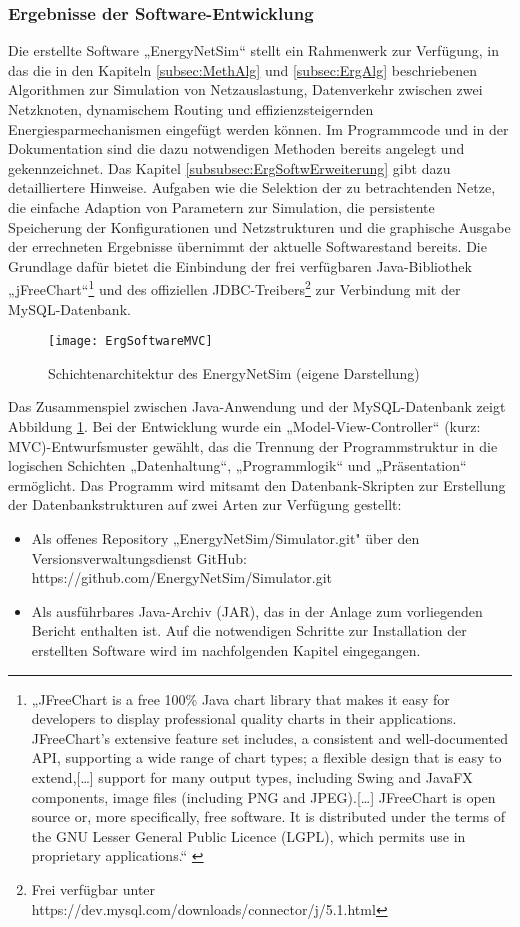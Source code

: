 \subsubsection{Ergebnisse der Software-Entwicklung}
Die erstellte Software „EnergyNetSim“ stellt ein Rahmenwerk zur Verfügung, in das die in den Kapiteln
\ref{subsec:MethAlg} und \ref{subsec:ErgAlg} beschriebenen Algorithmen zur Simulation von Netzauslastung, Datenverkehr zwischen zwei Netzknoten, dynamischem Routing und effizienzsteigernden Energiesparmechanismen eingefügt werden können. Im Programmcode und in der Dokumentation sind die dazu notwendigen Methoden bereits angelegt und gekennzeichnet. Das Kapitel \ref{subsubsec:ErgSoftwErweiterung} gibt dazu detailliertere Hinweise.
Aufgaben wie die Selektion der zu betrachtenden Netze, die einfache Adaption von Parametern zur Simulation, die persistente Speicherung der Konfigurationen und Netzstrukturen und die graphische Ausgabe der errechneten Ergebnisse übernimmt der aktuelle Softwarestand bereits. Die Grundlage dafür bietet die Einbindung der frei verfügbaren Java-Bibliothek „jFreeChart“\footnote{„JFreeChart is a free 100\% Java chart library that makes it easy for developers to display professional quality charts in their applications. JFreeChart's extensive feature set includes, a consistent and well-documented API, supporting a wide range of chart types; a flexible design that is easy to extend,[…] support for many output types, including Swing and JavaFX components, image files (including PNG and JPEG).[…] JFreeChart is open source or, more specifically, free software. It is distributed under the terms of the GNU Lesser General Public Licence (LGPL), which permits use in proprietary applications.“ \cite{jdbc}} und des offiziellen JDBC-Treibers\footnote{Frei verfügbar unter https://dev.mysql.com/downloads/connector/j/5.1.html} zur Verbindung mit der MySQL-Datenbank.
\begin{figure}[ht]
	\centering
	\texttt{[image: ErgSoftwareMVC]}
	\caption{Schichtenarchitektur des EnergyNetSim (eigene Darstellung)}
	\label{fig:ErgSoftwareMVC}
\end{figure}
Das Zusammenspiel zwischen Java-Anwendung und der MySQL-Datenbank zeigt
Abbildung \ref{fig:ErgSoftwareMVC}. Bei der Entwicklung wurde ein „Model-View-Controller“ (kurz: MVC)-Entwurfsmuster gewählt, das die Trennung der Programmstruktur in die logischen Schichten „Datenhaltung“, „Programmlogik“ und „Präsentation“ ermöglicht.
Das Programm wird mitsamt den Datenbank-Skripten zur Erstellung der Datenbankstrukturen auf zwei Arten zur Verfügung gestellt:
\begin{itemize}
\item Als offenes Repository „EnergyNetSim/Simulator.git" über den Versionsverwaltungsdienst GitHub: https://github.com/EnergyNetSim/Simulator.git
\item Als ausführbares Java-Archiv (JAR), das in der Anlage zum vorliegenden Bericht enthalten ist.
Auf die notwendigen Schritte zur Installation der erstellten Software wird im nachfolgenden Kapitel eingegangen.
\end{itemize}

